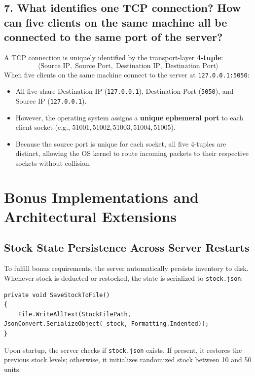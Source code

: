 \documentclass[12pt,a4paper]{article}
\begin{document}
\subsection{7. What identifies one TCP connection? How can five clients on the same machine all be connected to the same port of the server?}
A TCP connection is uniquely identified by the transport-layer \textbf{4-tuple}:
\begin{equation*}
    \langle \text{Source IP},\; \text{Source Port},\; \text{Destination IP},\; \text{Destination Port} \rangle
\end{equation*}
When five clients on the same machine connect to the server at \texttt{127.0.0.1:5050}:
\begin{itemize}
    \item All five share Destination IP (\texttt{127.0.0.1}), Destination Port (\texttt{5050}), and Source IP (\texttt{127.0.0.1}).
    \item However, the operating system assigns a \textbf{unique ephemeral port} to each client socket (e.g., $51001, 51002, 51003, 51004, 51005$).
    \item Because the source port is unique for each socket, all five 4-tuples are distinct, allowing the OS kernel to route incoming packets to their respective sockets without collision.
\end{itemize}

\section{Bonus Implementations and Architectural Extensions}

\subsection{Stock State Persistence Across Server Restarts}
To fulfill bonus requirements, the server automatically persists inventory to disk. Whenever stock is deducted or restocked, the state is serialized to \texttt{stock.json}:
\begin{lstlisting}
private void SaveStockToFile()
{
    File.WriteAllText(StockFilePath, JsonConvert.SerializeObject(_stock, Formatting.Indented));
}
\end{lstlisting}
Upon startup, the server checks if \texttt{stock.json} exists. If present, it restores the previous stock levels; otherwise, it initializes randomized stock between 10 and 50 units.
\end{document}
